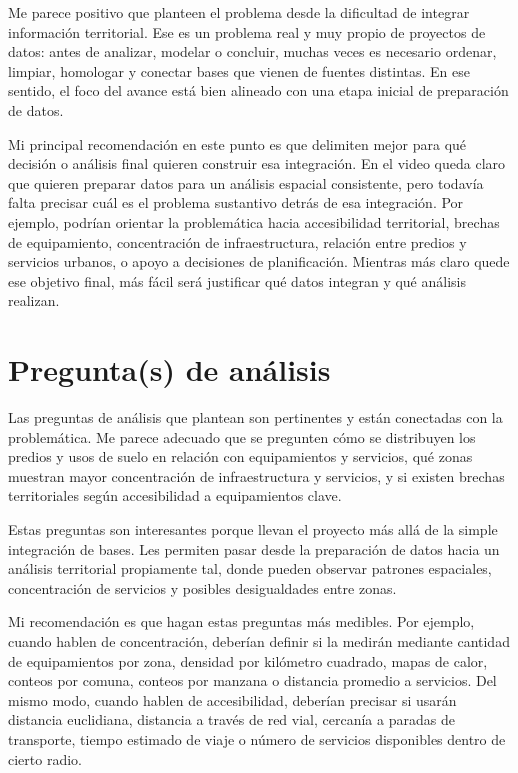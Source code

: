 \documentclass[11pt]{article}
\begin{document}
Me parece positivo que planteen el problema desde la dificultad de integrar información territorial. Ese es un problema real y muy propio de proyectos de datos: antes de analizar, modelar o concluir, muchas veces es necesario ordenar, limpiar, homologar y conectar bases que vienen de fuentes distintas. En ese sentido, el foco del avance está bien alineado con una etapa inicial de preparación de datos.

Mi principal recomendación en este punto es que delimiten mejor para qué decisión o análisis final quieren construir esa integración. En el video queda claro que quieren preparar datos para un análisis espacial consistente, pero todavía falta precisar cuál es el problema sustantivo detrás de esa integración. Por ejemplo, podrían orientar la problemática hacia accesibilidad territorial, brechas de equipamiento, concentración de infraestructura, relación entre predios y servicios urbanos, o apoyo a decisiones de planificación. Mientras más claro quede ese objetivo final, más fácil será justificar qué datos integran y qué análisis realizan.

\newpage

\section{Pregunta(s) de análisis}

Las preguntas de análisis que plantean son pertinentes y están conectadas con la problemática. Me parece adecuado que se pregunten cómo se distribuyen los predios y usos de suelo en relación con equipamientos y servicios, qué zonas muestran mayor concentración de infraestructura y servicios, y si existen brechas territoriales según accesibilidad a equipamientos clave.

Estas preguntas son interesantes porque llevan el proyecto más allá de la simple integración de bases. Les permiten pasar desde la preparación de datos hacia un análisis territorial propiamente tal, donde pueden observar patrones espaciales, concentración de servicios y posibles desigualdades entre zonas.

Mi recomendación es que hagan estas preguntas más medibles. Por ejemplo, cuando hablen de concentración, deberían definir si la medirán mediante cantidad de equipamientos por zona, densidad por kilómetro cuadrado, mapas de calor, conteos por comuna, conteos por manzana o distancia promedio a servicios. Del mismo modo, cuando hablen de accesibilidad, deberían precisar si usarán distancia euclidiana, distancia a través de red vial, cercanía a paradas de transporte, tiempo estimado de viaje o número de servicios disponibles dentro de cierto radio.
\end{document}
